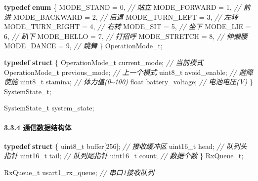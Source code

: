 \documentclass[
]{article}
\newenvironment{Shaded}{}{}
\newcommand{\CharTok}[1]{\textcolor[rgb]{0.25,0.44,0.63}{#1}}
\newcommand{\CommentTok}[1]{\textcolor[rgb]{0.38,0.63,0.69}{\textit{#1}}}
\newcommand{\DataTypeTok}[1]{\textcolor[rgb]{0.56,0.13,0.00}{#1}}
\newcommand{\DecValTok}[1]{\textcolor[rgb]{0.25,0.63,0.44}{#1}}
\newcommand{\KeywordTok}[1]{\textcolor[rgb]{0.00,0.44,0.13}{\textbf{#1}}}
\newcommand{\NormalTok}[1]{#1}
\begin{document}
\begin{Shaded}
\begin{Highlighting}[]
\KeywordTok{typedef} \KeywordTok{enum}\NormalTok{ \{}
\NormalTok{    MODE\_STAND = }\CharTok{\textquotesingle{}0\textquotesingle{}}\NormalTok{,        }\CommentTok{// 站立}
\NormalTok{    MODE\_FORWARD = }\CharTok{\textquotesingle{}1\textquotesingle{}}\NormalTok{,      }\CommentTok{// 前进}
\NormalTok{    MODE\_BACKWARD = }\CharTok{\textquotesingle{}2\textquotesingle{}}\NormalTok{,     }\CommentTok{// 后退}
\NormalTok{    MODE\_TURN\_LEFT = }\CharTok{\textquotesingle{}3\textquotesingle{}}\NormalTok{,    }\CommentTok{// 左转}
\NormalTok{    MODE\_TURN\_RIGHT = }\CharTok{\textquotesingle{}4\textquotesingle{}}\NormalTok{,   }\CommentTok{// 右转}
\NormalTok{    MODE\_SIT = }\CharTok{\textquotesingle{}5\textquotesingle{}}\NormalTok{,          }\CommentTok{// 坐下}
\NormalTok{    MODE\_LIE = }\CharTok{\textquotesingle{}6\textquotesingle{}}\NormalTok{,          }\CommentTok{// 趴下}
\NormalTok{    MODE\_HELLO = }\CharTok{\textquotesingle{}7\textquotesingle{}}\NormalTok{,        }\CommentTok{// 打招呼}
\NormalTok{    MODE\_STRETCH = }\CharTok{\textquotesingle{}8\textquotesingle{}}\NormalTok{,      }\CommentTok{// 伸懒腰}
\NormalTok{    MODE\_DANCE = }\CharTok{\textquotesingle{}9\textquotesingle{}}\NormalTok{,        }\CommentTok{// 跳舞}
\NormalTok{\} OperationMode\_t;}

\KeywordTok{typedef} \KeywordTok{struct}\NormalTok{ \{}
\NormalTok{    OperationMode\_t current\_mode;   }\CommentTok{// 当前模式}
\NormalTok{    OperationMode\_t previous\_mode;  }\CommentTok{// 上一个模式}
    \DataTypeTok{uint8\_t}\NormalTok{ avoid\_enable;           }\CommentTok{// 避障使能}
    \DataTypeTok{uint8\_t}\NormalTok{ stamina;                }\CommentTok{// 体力值(0\textasciitilde{}100)}
    \DataTypeTok{float}\NormalTok{ battery\_voltage;          }\CommentTok{// 电池电压(V)}
\NormalTok{\} SystemState\_t;}

\NormalTok{SystemState\_t system\_state;}
\end{Highlighting}
\end{Shaded}

\hypertarget{ux901aux4fe1ux6570ux636eux7ed3ux6784ux4f53}{%
\paragraph{3.3.4
通信数据结构体}\label{ux901aux4fe1ux6570ux636eux7ed3ux6784ux4f53}}

\begin{Shaded}
\begin{Highlighting}[]
\KeywordTok{typedef} \KeywordTok{struct}\NormalTok{ \{}
    \DataTypeTok{uint8\_t}\NormalTok{ buffer[}\DecValTok{256}\NormalTok{];     }\CommentTok{// 接收缓冲区}
    \DataTypeTok{uint16\_t}\NormalTok{ head;           }\CommentTok{// 队列头指针}
    \DataTypeTok{uint16\_t}\NormalTok{ tail;           }\CommentTok{// 队列尾指针}
    \DataTypeTok{uint16\_t}\NormalTok{ count;          }\CommentTok{// 数据个数}
\NormalTok{\} RxQueue\_t;}

\NormalTok{RxQueue\_t usart1\_rx\_queue;   }\CommentTok{// 串口1接收队列}
\end{Highlighting}
\end{Shaded}
\end{document}
